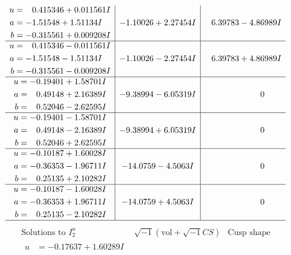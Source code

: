 \documentclass[1p]{elsarticle_modified}
\theoremstyle{definition}
\newcommand{\I}{\sqrt{-1}}
\begin{document}
$$\begin{array}{c|c|c}
\begin{aligned}
u &= \phantom{-}0.415346 + 0.011561 I \\
a &= -1.51548 + 1.51134 I \\
b &= -0.315561 + 0.009208 I\end{aligned}
 & -1.10026 + 2.27454 I & \phantom{-}6.39783 - 4.86989 I \\ \hline\begin{aligned}
u &= \phantom{-}0.415346 - 0.011561 I \\
a &= -1.51548 - 1.51134 I \\
b &= -0.315561 - 0.009208 I\end{aligned}
 & -1.10026 - 2.27454 I & \phantom{-}6.39783 + 4.86989 I \\ \hline\begin{aligned}
u &= -0.19401 + 1.58701 I \\
a &= \phantom{-}0.49148 + 2.16389 I \\
b &= \phantom{-}0.52046 - 2.62595 I\end{aligned}
 & -9.38994 - 6.05319 I & \phantom{-0.000000 } 0 \\ \hline\begin{aligned}
u &= -0.19401 - 1.58701 I \\
a &= \phantom{-}0.49148 - 2.16389 I \\
b &= \phantom{-}0.52046 + 2.62595 I\end{aligned}
 & -9.38994 + 6.05319 I & \phantom{-0.000000 } 0 \\ \hline\begin{aligned}
u &= -0.10187 + 1.60028 I \\
a &= -0.36353 - 1.96711 I \\
b &= \phantom{-}0.25135 + 2.10282 I\end{aligned}
 & -14.0759 - 4.5063 I & \phantom{-0.000000 } 0 \\ \hline\begin{aligned}
u &= -0.10187 - 1.60028 I \\
a &= -0.36353 + 1.96711 I \\
b &= \phantom{-}0.25135 - 2.10282 I\end{aligned}
 & -14.0759 + 4.5063 I & \phantom{-0.000000 } 0\\
 \hline 
 \end{array}$$\newpage$$\begin{array}{c|c|c}  
\text{Solutions to }I^u_{2}& \I (\text{vol} + \sqrt{-1}CS) & \text{Cusp shape}\\
 \hline 
\begin{aligned}
u &= -0.17637 + 1.60289 I \\

\end{aligned}
\end{array}$$
\end{document}
